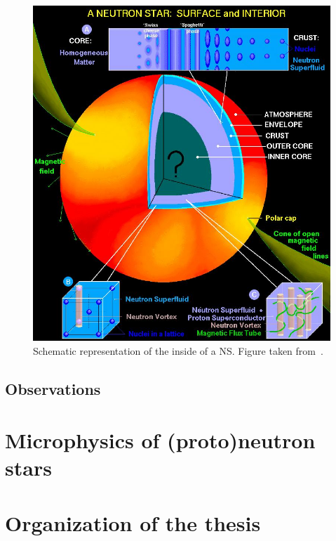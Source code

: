 
\begin{figure}[!t]
\begin{center}
  \includegraphics[width=0.8\linewidth]{figures/NStarInt.jpeg}
\end{center}
\caption[Schematic representation of the inside of a neutron star]{Schematic
representation of the inside of a NS. Figure taken 
from~\cite{Page2006}.}\label{fig:NStarInt}
\end{figure}
%

\subsection*{Observations}





\section*{Microphysics of (proto)neutron stars}

\section*{Organization of the thesis}

\clearpage\thispagestyle{empty}
